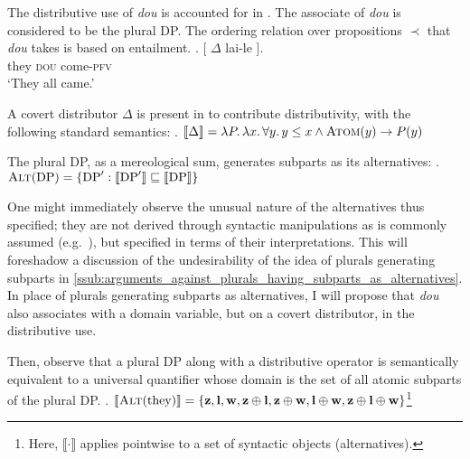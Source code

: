 \documentclass[12pt]{article}
\DeclareMathOperator{\atom}{\textsc{Atom}}
\DeclareMathOperator{\alt}{\textsc{Alt}}
\begin{document}
The distributive use of \emph{dou} is accounted for in \citet{liuVarietiesAlternativesMandarin2017}.
The associate of \emph{dou} is considered to be the plural DP.
The ordering relation over propositions \(\prec\) that \emph{dou} takes is based on entailment.
\vspace{2em}
\ex.  \gll
{} [  \(\Delta\)  lai-le ].\\
{} {} they {} \textsc{dou} come-\textsc{pfv}\\
\glt `They all came.'

A covert distributor \(\Delta\) is present in \Last to contribute distributivity, with the following standard semantics:
\ex. \(\llbracket \Delta \rrbracket = \lambda P.\, \lambda x.\, \forall y.\, y \leq x \land \atom(y) \to P(y)\) \label{itm:dist}

The plural DP, as a mereological sum, generates subparts as its alternatives:
\ex. \(\alt(\text{DP}) = \{ \text{DP}' : \llbracket \text{DP}' \rrbracket \sqsubseteq \llbracket \text{DP} \rrbracket\}\)

One might immediately observe the unusual nature of the alternatives thus specified; they are not derived through syntactic manipulations as is commonly assumed (e.g.\ \citealt{foxCharacterizationAlternatives2011}), but specified in terms of their interpretations.
This will foreshadow a discussion of the undesirability of the idea of plurals generating subparts in \cref{ssub:arguments_against_plurals_having_subparts_as_alternatives}.
In place of plurals generating subparts as alternatives, I will propose that \emph{dou} also associates with a domain variable, but on a covert distributor, in the distributive use.

Then, observe that a  plural DP along with a distributive operator is semantically equivalent to a universal quantifier whose domain is the set of all atomic subparts of the plural DP.
\ex. \(\llbracket \alt(\text{they}) \rrbracket = \{ \mathbf{z}, \mathbf{l}, \mathbf{w}, \mathbf{z} \oplus \mathbf{l}, \mathbf{z} \oplus \mathbf{w}, \mathbf{l} \oplus \mathbf{w}, \mathbf{z} \oplus \mathbf{l} \oplus \mathbf{w} \}\)\footnote{Here, \(\llbracket \cdot \rrbracket\) applies pointwise to a set of syntactic objects (alternatives).
}
\end{document}
